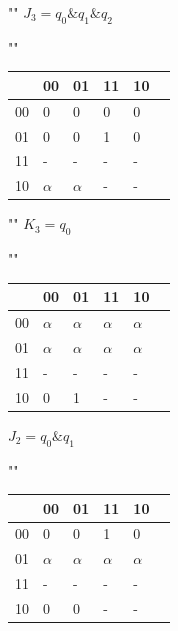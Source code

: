 \begin{center}
    \pagebreak

	""\newline\newline
	$J_{3} = q_{0} \& q_{1} \& q_{2}$
	
	""\newline
	\begin{tabular}{ | l | l | l | l | l | p{1cm} |}
		\hline
		\diagbox[width=5em]{$q_{3}q_{2}$}{$q_{1}q_{0}$} & 00 & 01 & 11 & 10 \\\hline
		00 & 0 & 0  & 0 & 0  \\\hline
		01 & 0 & 0  & \cellcolor{blue!25} 1 & 0  \\\hline
		11 & - & -  & \cellcolor{blue!25} - & -  \\\hline
		10 & $\alpha$ & $\alpha$  & - & -  \\
		\hline
	\end{tabular}

	""\newline\newline
	$K_{3} = q_{0}$
	
	""\newline
	\begin{tabular}{ | l | l | l | l | l | p{1cm} |}
		\hline
		\diagbox[width=5em]{$q_{3}q_{2}$}{$q_{1}q_{0}$} & 00 & 01 & 11 & 10 \\\hline
		00 & $\alpha$ & \cellcolor{blue!25} $\alpha$  & \cellcolor{blue!25} $\alpha$ & $\alpha$  \\\hline
		01 & $\alpha$ & \cellcolor{blue!25} $\alpha$  & \cellcolor{blue!25} $\alpha$ & $\alpha$  \\\hline
		11 & - & \cellcolor{blue!25} -  & \cellcolor{blue!25} - & -  \\\hline
		10 & 0 & \cellcolor{blue!25} 1  & \cellcolor{blue!25} - & -  \\
		\hline
	\end{tabular}

	\clearpage
	$J_{2} = q_{0} \& q_{1}$
	
	""\newline
	\begin{tabular}{ | l | l | l | l | l | p{1cm} |}
		\hline
		\diagbox[width=5em]{$q_{3}q_{2}$}{$q_{1}q_{0}$} & 00 & 01 & 11 & 10 \\\hline
		00 & 0 & 0  & \cellcolor{blue!25} 1 & 0  \\\hline
		01 & $\alpha$ & $\alpha$ & \cellcolor{blue!25} $\alpha$ & $\alpha$  \\\hline
		11 & - & -  & \cellcolor{blue!25} - & -  \\\hline
		10 & 0 & 0  & \cellcolor{blue!25} - & -  \\
		\hline
	\end{tabular}


\end{center}
